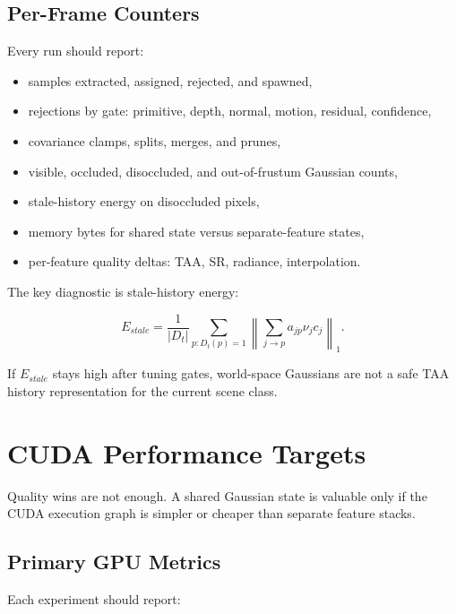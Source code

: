 \documentclass[11pt]{article}
\begin{document}
\subsection{Per-Frame Counters}

Every run should report:

\begin{itemize}
  \item samples extracted, assigned, rejected, and spawned,
  \item rejections by gate: primitive, depth, normal, motion, residual,
        confidence,
  \item covariance clamps, splits, merges, and prunes,
  \item visible, occluded, disoccluded, and out-of-frustum Gaussian counts,
  \item stale-history energy on disoccluded pixels,
  \item memory bytes for shared state versus separate-feature states,
  \item per-feature quality deltas: TAA, SR, radiance, interpolation.
\end{itemize}

The key diagnostic is stale-history energy:

\[
  E_{stale} =
  \frac{1}{|D_t|}
  \sum_{p:D_t(p)=1}
  \left\|
    \sum_{j\rightarrow p} a_{jp}\nu_j c_j
  \right\|_1.
\]

If $E_{stale}$ stays high after tuning gates, world-space Gaussians are not a
safe TAA history representation for the current scene class.

\section{CUDA Performance Targets}

Quality wins are not enough. A shared Gaussian state is valuable only if the
CUDA execution graph is simpler or cheaper than separate feature stacks.

\subsection{Primary GPU Metrics}

Each experiment should report:
\end{document}

